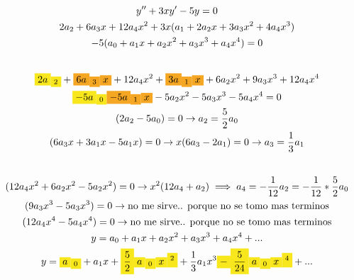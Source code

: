 \documentclass{article}
\begin{document}
\begin{gather*}
y''+3xy'-5y=0 \\
2a_{2}+6a_{3}x+ 12a_{4}x^{2}+3x(a_{1}+2a_{2}x+3a_{3}x^{2}+ 4a_{4}x^{3}) \\
-5(a_{0}+a_{1}x+a_{2}x^{2}+a_{3}x^{3}+ a_{4}x^{4})=0 \\
\vspace{0.5em} \\
\text{\colorbox[RGB]{248,231,28}{$2a$}}\text{\colorbox[RGB]{248,231,28}{$_{2}$}}+\text{\colorbox[RGB]{245,166,35}{$6a$}}\text{\colorbox[RGB]{245,166,35}{$_{3}$}}\text{\colorbox[RGB]{245,166,35}{$x$}}+ 12a_{4}x^{2}+\text{\colorbox[RGB]{245,166,35}{$3a$}}\text{\colorbox[RGB]{245,166,35}{$_{1}$}}\text{\colorbox[RGB]{245,166,35}{$x$}}+6a_{2}x^{2}+9a_{3}x^{3}+ 12a_{4}x^{4} \\
\text{\colorbox[RGB]{248,231,28}{$-5a$}}\text{\colorbox[RGB]{248,231,28}{$_{0}$}}\text{\colorbox[RGB]{245,166,35}{$-5a$}}\text{\colorbox[RGB]{245,166,35}{$_{1}$}}\text{\colorbox[RGB]{245,166,35}{$x$}}-5a_{2}x^{2}-5a_{3}x^{3}-5 a_{4}x^{4}=0 \\
(2a_{2}-5a_{0}) = 0   \rightarrow a_{2} =\frac{5}{2}a_{0} \\
(6a_{3}x+3a_{1}x-5a_{1}x)=0  \rightarrow x(6a_{3}-2a_{1})=0  \rightarrow a_{3} =\frac{1}{3}a_{1} \\
\vspace{0.5em} \\
(12a_{4}x^{2}+6a_{2}x^{2}-5a_{2}x^{2})=0  \rightarrow x^{2}(12a_{4}+a_{2}) \implies  a_{4}=-\frac{1}{12}a_{2}=-\frac{1}{12}*\frac{5}{2}a_{0} \\
(9a_{3}x^{3}-5a_{3}x^{3}) =0  \rightarrow \text{no me sirve.. porque no se tomo mas terminos} \\
(12a_{4}x^{4}-5 a_{4}x^{4})=0 \rightarrow \text{no me sirve.. porque no se tomo mas terminos} \\
y = a_{0}+a_{1}x+a_{2}x^{2}+a_{3}x^{3}+ a_{4}x^{4}+... \\
y =\text{\colorbox[RGB]{248,231,28}{$ a$}}\text{\colorbox[RGB]{248,231,28}{$_{0}$}}+a_{1}x+\text{\colorbox[RGB]{248,231,28}{$\frac{5}{2}$}}\text{\colorbox[RGB]{248,231,28}{$a$}}\text{\colorbox[RGB]{248,231,28}{$_{0}$}}\text{\colorbox[RGB]{248,231,28}{$x$}}\text{\colorbox[RGB]{248,231,28}{$^{2}$}}+\frac{1}{3}a_{1}x^{3}\text{\colorbox[RGB]{248,231,28}{$- $}}\text{\colorbox[RGB]{248,231,28}{$\frac{5}{24}$}}\text{\colorbox[RGB]{248,231,28}{$a$}}\text{\colorbox[RGB]{248,231,28}{$_{0}$}}\text{\colorbox[RGB]{248,231,28}{$x$}}\text{\colorbox[RGB]{248,231,28}{$^{4}$}}+... \\

\end{gather*}
\end{document}
